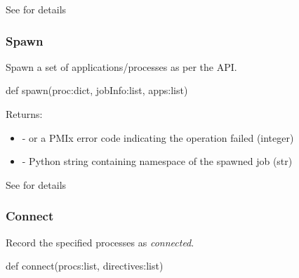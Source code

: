 See  for details


\subsubsection{Spawn}

\summary

Spawn a set of applications/processes as per the  API.

\format

\pyspecificstart
\begin{codepar}
def spawn(proc:dict, jobInfo:list, apps:list)
\end{codepar}
\pyspecificend

\begin{arglist}
\end{arglist}

Returns:
\begin{itemize}
    \item {} -  or a \ac{PMIx} error code indicating the operation failed (integer)
    \item {} - Python string containing namespace of the spawned job (str)
\end{itemize}

See  for details


\subsubsection{Connect}

\summary

Record the specified processes as \textit{connected}.

\format

\pyspecificstart
\begin{codepar}
def connect(procs:list, directives:list)
\end{codepar}
\pyspecificend

\begin{arglist}
\end{arglist}

